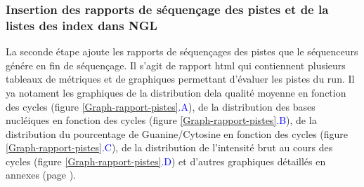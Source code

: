 \subsubsection{Insertion des rapports de séquençage des pistes et de la listes des index dans NGL}
La seconde étape ajoute les rapports de séquençages des pistes que le séquenceurs génére en fin de séquençage.
Il s'agit de rapport html qui contiennent plusieurs tableaux de métriques et de graphiques permettant d'évaluer les pistes du run.
Il ya notament les graphiques de la distribution dela qualité moyenne en fonction des cycles (figure \ref{Graph-rapport-pistes}\textcolor{blue}{.A}), de la distribution des bases nucléiques en fonction des cycles (figure \ref{Graph-rapport-pistes}\textcolor{blue}{.B}), de la distribution du pourcentage de Guanine/Cytosine en fonction des cycles (figure \ref{Graph-rapport-pistes}\textcolor{blue}{.C}), de la distribution de l'intensité brut au cours des cycles (figure \ref{Graph-rapport-pistes}\textcolor{blue}{.D}) et d'autres graphiques détaillés en annexes (page \pageref{anexes2}).

